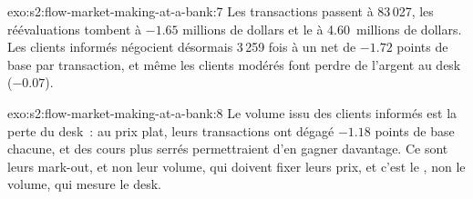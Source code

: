 \begin{solution}{exo:s2:flow-market-making-at-a-bank:7}
Les transactions passent à 83\,027, les réévaluations tombent à $-1.65$ millions de dollars et le  à 4.60~millions de dollars. Les clients informés négocient désormais 3\,259 fois à un
net de $-1.72$ points de base par transaction, et même les clients modérés font perdre de l'argent au desk ($-0.07$).
\end{solution}

\begin{solution}{exo:s2:flow-market-making-at-a-bank:8}
Le volume issu des clients informés est la perte du desk~: au prix plat, leurs transactions ont dégagé $-1.18$ points de base chacune, et des cours plus serrés permettraient d'en gagner
davantage. Ce sont leurs mark-out, et non leur volume, qui doivent fixer leurs prix, et c'est le , non le volume, qui mesure le desk.
\end{solution}


